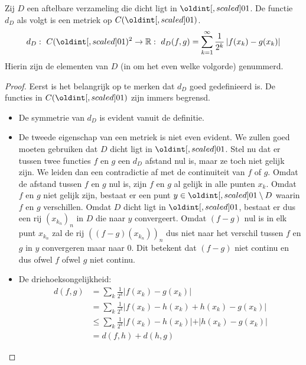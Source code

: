 \documentclass[main.tex]{subfiles}
\begin{document}
\begin{vb}
  Zij $D$ een aftelbare verzameling die dicht ligt in $\interval{0}{1}$.
  De functie $d_{D}$ als volgt is een metriek op $C(\interval{0}{1})$.
  \[ d_{D}:\ C(\interval{0}{1})^{2} \rightarrow \mathbb{R}:\ d_{D}(f,g) = \sum_{k=1}^{\infty}\frac{1}{2^{k}}\left| f(x_{k}) - g(x_{k})\right| \]
  Hierin zijn de elementen van $D$ (in om het even welke volgorde) genummerd.
  
  \begin{proof}
    Eerst is het belangrijk op te merken dat $d_{D}$ goed gedefinieerd is.
    De functies in $C(\interval{0}{1})$ zijn immers begrensd.
    \begin{itemize}
    \item De symmetrie van $d_{D}$ is evident vanuit de definitie.
    \item De tweede eigenschap van een metriek is niet even evident.
      We zullen goed moeten gebruiken dat $D$ dicht ligt in $\interval{0}{1}$.
      Stel nu dat er tussen twee functies $f$ en $g$ een $d_{D}$ afstand nul is, maar ze toch niet gelijk zijn.
      We leiden dan een contradictie af met de continuiteit van $f$ of $g$.
      Omdat de afstand tussen $f$ en $g$ nul is, zijn $f$ en $g$ al gelijk in alle punten $x_{k}$.
      Omdat $f$ en $g$ niet gelijk zijn, bestaat er een punt $y\in \interval{0}{1} \setminus D$ waarin $f$ en $g$ verschillen.
      Omdat $D$ dicht ligt in $\interval{0}{1}$, bestaat er dus een rij $(x_{k_{n}})_{n}$ in $D$ die naar $y$ convergeert.
      Omdat $(f-g)$ nul is in elk punt $x_{k_{n}}$ zal de rij $((f-g)(x_{k_{n}}))_{n}$ dus niet naar het verschil tussen $f$ en $g$ in $y$ convergeren maar naar $0$.
      Dit betekent dat $(f-g)$ niet continu en dus ofwel $f$ ofwel $g$ niet continu.
    \item De driehoeksongelijkheid:
      \begin{align*}
        d(f,g)
        &= \sum_{k}\frac{1}{2^{k}}\left| f(x_{k}) - g(x_{k})\right|\\
        &= \sum_{k}\frac{1}{2^{k}}\left| f(x_{k}) - h(x_{k}) + h(x_{k}) - g(x_{k})\right|\\
        &\le \sum_{k}\frac{1}{2^{k}}\left| f(x_{k}) - h(x_{k})| + |h(x_{k}) - g(x_{k})\right|\\
        &= d(f,h) + d(h,g)
      \end{align*}
    \end{itemize}
  \end{proof}
\end{vb}
\end{document}
